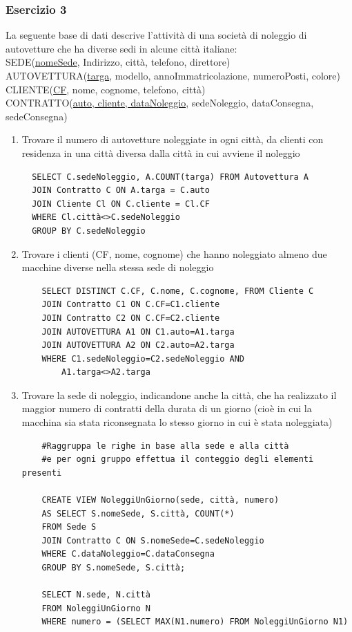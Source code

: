 \documentclass[a4paper]{article}
\begin{document}
\subsubsection{Esercizio 3}
La seguente base di dati descrive l'attività di una società di noleggio di autovetture che ha diverse sedi in alcune città italiane:\medskip\\
SEDE(\underline{nomeSede}, Indirizzo, città, telefono, direttore)\\
AUTOVETTURA(\underline{targa}, modello, annoImmatricolazione, numeroPosti, colore)\\
CLIENTE(\underline{CF}, nome, cognome, telefono, città)\\
CONTRATTO(\underline{auto, cliente, dataNoleggio}, sedeNoleggio, dataConsegna, sedeConsegna)

\begin{enumerate}
  \item Trovare il numero di autovetture noleggiate in ogni città, da clienti con residenza in una città diversa dalla città in cui avviene il noleggio
  \begin{verbatim}
  SELECT C.sedeNoleggio, A.COUNT(targa) FROM Autovettura A
  JOIN Contratto C ON A.targa = C.auto
  JOIN Cliente Cl ON C.cliente = Cl.CF
  WHERE Cl.città<>C.sedeNoleggio
  GROUP BY C.sedeNoleggio
  \end{verbatim}
  \item Trovare i clienti (CF, nome, cognome) che hanno noleggiato almeno due macchine diverse nella stessa sede di noleggio
  \begin{verbatim}
    SELECT DISTINCT C.CF, C.nome, C.cognome, FROM Cliente C
    JOIN Contratto C1 ON C.CF=C1.cliente
    JOIN Contratto C2 ON C.CF=C2.cliente
    JOIN AUTOVETTURA A1 ON C1.auto=A1.targa
    JOIN AUTOVETTURA A2 ON C2.auto=A2.targa
    WHERE C1.sedeNoleggio=C2.sedeNoleggio AND
        A1.targa<>A2.targa
  \end{verbatim}
  \item Trovare la sede di noleggio, indicandone anche la città, che ha realizzato il maggior numero di contratti della durata di un giorno (cioè in cui la macchina sia stata riconsegnata lo stesso giorno in cui è stata noleggiata)
  \begin{verbatim}
    #Raggruppa le righe in base alla sede e alla città
    #e per ogni gruppo effettua il conteggio degli elementi presenti

    CREATE VIEW NoleggiUnGiorno(sede, città, numero)
    AS SELECT S.nomeSede, S.città, COUNT(*)
    FROM Sede S
    JOIN Contratto C ON S.nomeSede=C.sedeNoleggio
    WHERE C.dataNoleggio=C.dataConsegna
    GROUP BY S.nomeSede, S.città;

    SELECT N.sede, N.città
    FROM NoleggiUnGiorno N
    WHERE numero = (SELECT MAX(N1.numero) FROM NoleggiUnGiorno N1)
  \end{verbatim}
\end{enumerate}
\end{document}
